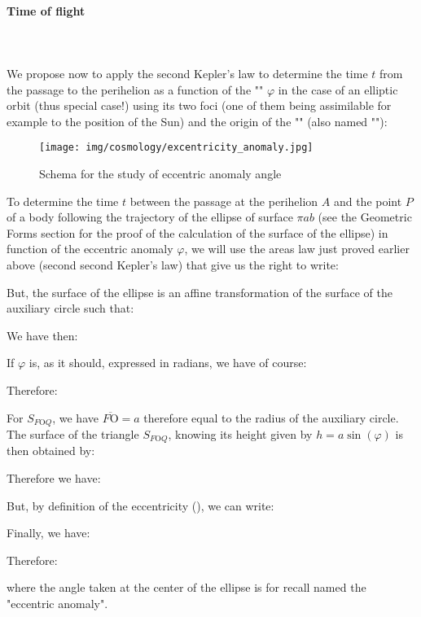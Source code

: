 	\paragraph{Time of flight}\mbox{}\\\\
	We propose now to apply the second Kepler's law to determine the time $t$ from the passage to the perihelion as a function of the "" $\varphi$ in the case of an elliptic orbit  (thus special case!) using its two foci (one of them being assimilable for example to the position of the Sun) and the origin of the "" (also named ""):
	\begin{figure}[H]
		\begin{center}
		\texttt{[image: img/cosmology/excentricity\_anomaly.jpg]}
		\end{center}	
		\caption{Schema for the study of eccentric anomaly angle}
	\end{figure}
	To determine the time $t$ between the passage at the perihelion $A$ and the point $P$ of a body following the trajectory of the ellipse of surface $\pi a b$ (see the Geometric Forms section for the proof of the calculation of the surface of the ellipse) in function of the eccentric anomaly $\varphi$, we will use the areas law just proved earlier above (second second Kepler's law) that give us the right to write:
	
	But, the surface of the ellipse is an affine transformation of the surface of the auxiliary circle such that:
	
 	We have then:
	
 	If $\varphi$ is, as it should, expressed in radians, we have of course:
	
 	Therefore:
	
 	For $S_{F\text{O}Q}$, we have $\overline{F\text{O}}=a$ therefore equal to the radius of the auxiliary circle. The surface of the triangle $S_{F\text{O}Q}$, knowing its height given by $h=a\sin(\varphi)$ is then obtained by:
	
	Therefore we have:
	
	But, by definition of the eccentricity (), we can write:
	
	Finally, we have:
	
	Therefore:
	
 	where the angle taken at the center of the ellipse is for recall named the "eccentric anomaly".

